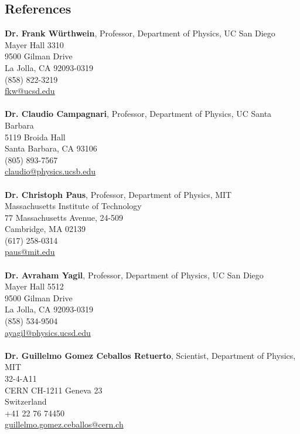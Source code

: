 \documentclass[margin]{res}
\begin{document}
\begin{resume}
\section{References}
\textbf{Dr. Frank W\"urthwein}, %
Professor, Department of Physics, UC San Diego                  \\
Mayer Hall 3310 \\
9500 Gilman Drive \\
La Jolla, CA 92093-0319 \\
(858) 822-3219 \\
\href{fkw@ucsd.edu}{fkw@ucsd.edu} \\
\\
\textbf{Dr. Claudio Campagnari}, %
Professor, Department of Physics, UC Santa Barbara              \\
5119 Broida Hall \\
Santa Barbara, CA 93106 \\
(805) 893-7567 \\
\href{claudio@physics.ucsb.edu}{claudio@physics.ucsb.edu} \\
\\
\textbf{Dr.  Christoph Paus}, %
Professor, Department of Physics, MIT     \\
Massachusetts Institute of Technology  \\
77 Massachusetts Avenue, 24-509 \\
Cambridge, MA 02139 \\
(617) 258-0314  \\ 
\href{paus@mit.edu}{paus@mit.edu} \\
\\
\textbf{Dr. Avraham Yagil}, %
Professor, Department of Physics, UC San Diego                  \\
Mayer Hall 5512  \\ 
9500 Gilman Drive \\
La Jolla, CA 92093-0319 \\
(858) 534-9504 \\
\href{ayagil@physics.ucsd.edu}{ayagil@physics.ucsd.edu} \\
\\
\textbf{Dr. Guillelmo Gomez Ceballos Retuerto}, %
Scientist, Department of Physics, MIT    \\
32-4-A11 \\
CERN CH-1211 Geneva 23 \\
Switzerland \\
+41 22 76 74450 \\
\href{guillelmo.gomez.ceballos@cern.ch}{guillelmo.gomez.ceballos@cern.ch}


\end{resume}
\end{document}
